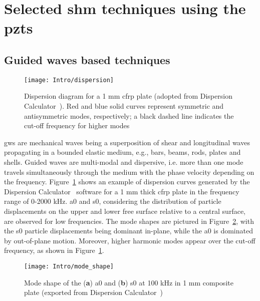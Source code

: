 \section{Selected \acl{shm} techniques using the \aclp{pzt}}
\label{sec:techniques}


\subsection{Guided waves based techniques}

\begin{figure}[!htb]
	\begin{center}
		\texttt{[image: Intro/dispersion]}
	\end{center}
	\caption{Dispersion diagram for a 1 \unit{\mm} \acs{cfrp} plate (adopted from Dispersion Calculator~\cite{huber2021dispersion}). Red and blue solid curves represent symmetric and antisymmetric modes, respectively; a black dashed line indicates the cut-off frequency for higher modes}
	\label{fig:dispersion}
\end{figure}
\Acp{gw} are mechanical waves being a superposition of shear and longitudinal waves propagating in a bounded elastic medium, e.g., bars, beams, rods, plates and shells. 
Guided waves are multi-modal and dispersive, i.e. more than one mode travels simultaneously through the medium with the phase velocity depending on the frequency.
Figure~\ref{fig:dispersion} shows an example of dispersion curves generated by the Dispersion Calculator~\cite{huber2021dispersion} software for a 1 \unit{\mm} thick \ac{cfrp} plate in the frequency range of 0-2000 \unit{\kHz}.
\Ac{a0} and \ac{s0}, considering the distribution of particle displacements on the upper and lower free surface relative to a central surface, are observed for low frequencies.
The mode shapes are pictured in Figure~\ref{fig:mode_shape}, with the \ac{s0} particle displacements being dominant in-plane, while the \ac{a0} is dominated by out-of-plane motion.
Moreover, higher harmonic modes appear over the cut-off frequency, as shown in Figure~\ref{fig:dispersion}.

\begin{figure}[!htb]
	\begin{center}
		\texttt{[image: Intro/mode\_shape]}
	\end{center}
	\caption{Mode shape of the (\textbf{a}) \acl{a0} and (\textbf{b}) \acl{s0} at 100 \unit{\kHz} in 1 \unit{\mm} composite plate (exported from Dispersion Calculator~\cite{huber2021dispersion})}
	\label{fig:mode_shape}
\end{figure}

